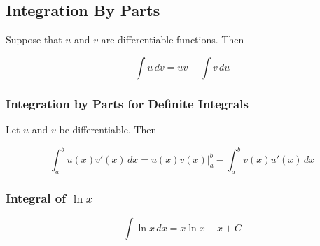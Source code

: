 \subsection{Integration By Parts}
Suppose that $u$ and $v$ are differentiable functions. Then

\begin{equation}
    \int u\, dv = uv - \int v\, du
\end{equation}

\subsubsection{Integration by Parts for Definite Integrals}
Let $u$ and $v$ be differentiable. Then

\begin{equation}
    \int ^b _a u(x) v'(x) \, dx = u(x) v(x) \bigg\rvert _a ^b - \int _a ^b v(x) u'(x) \, dx
\end{equation}

\subsubsection{Integral of $\ln x$}
\begin{equation}
    \int \ln x\, dx = x \ln x - x + C
\end{equation}
